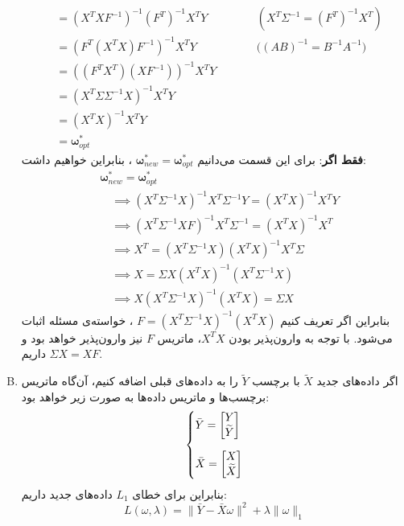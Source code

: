 \documentclass[a4paper, 12pt]{article}
\begin{document}
\begin{enumerate}[A)]
\[\begin{aligned}
			&= \left(X^TXF^{-1}\right)^{-1} (F^T)^{-1}X^TY &&\qquad (X^T\Sigma^{-1} = (F^{T})^{-1}X^T) \\
			&= \left(F^T(X^TX)F^{-1}\right)^{-1} X^TY &&\qquad \big((AB)^{-1} = B^{-1}A^{-1}\big)\\
			&= \left((F^TX^T)(XF^{-1})\right)^{-1}X^TY \\
			&= \left(X^T\Sigma\Sigma^{-1}X\right)^{-1}X^TY \\
			&= \left(X^TX\right)^{-1}X^TY \\
			&= \bm{\omega}^\ast_{opt}
	\end{aligned}
	\]
	\textbf{فقط اگر}:
	برای این قسمت می‌دانیم 
	$\bm{\omega}^\ast_{new} = \bm{\omega}^\ast_{opt}$
	، بنابراین خواهیم داشت:
	\[
	\begin{aligned}
		&\bm{\omega}^\ast_{new} = \bm{\omega}^\ast_{opt} \\
		&\quad\implies \left(X^T\Sigma^{-1}X\right)^{-1}X^T\Sigma^{-1}Y = \left(X^TX\right)^{-1}X^TY \\
		&\quad\implies \left(X^T\Sigma^{-1}XF\right)^{-1}X^T\Sigma^{-1} = \left(X^TX\right)^{-1}X^T \\
		&\quad\implies X^T = \left(X^T\Sigma^{-1}X\right)\left(X^TX\right)^{-1}X^T\Sigma\\
		&\quad\implies X = \Sigma X \left(X^TX\right)^{-1}\left(X^T\Sigma^{-1}X\right)\\
		&\quad\implies X \left(X^T\Sigma^{-1}X\right)^{-1}\left(X^TX\right) = \Sigma X
	\end{aligned}
	\]
	بنابراین اگر تعریف کنیم
	$F = \left(X^T\Sigma^{-1}X\right)^{-1}\left(X^TX\right)$
	، خواسته‌ی مسئله اثبات می‌شود. با توجه به وارون‌پذیر بودن $X^TX$، ماتریس $F$ نیز وارون‌پذیر خواهد بود و داریم
	$\Sigma X = XF$.
	\item
	اگر داده‌های جدید
	$\widetilde{X}$
	با برچسب
	$\widetilde{Y}$
	را به داده‌های قبلی اضافه کنیم، آن‌گاه ماتریس برچسب‌ها و ماتریس داده‌ها به صورت زیر خواهد بود:
	\[
	\begin{dcases}
		\bar{Y} = \begin{bmatrix}
			Y \\
			\widetilde{Y}
		\end{bmatrix} \\[0.5em]
		\bar{X} = \begin{bmatrix}
			X \\
			\widetilde{X}
		\end{bmatrix}
	\end{dcases}
	\]
	بنابراین برای خطای $L_1$ داده‌های جدید داریم:
	\[
	L(\omega, \lambda) = \|\bar{Y} - \bar{X}\omega\|^2 + \lambda \|\omega\|_1
\]
\end{enumerate}
\end{document}
